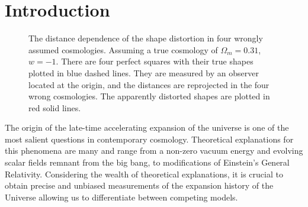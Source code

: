 \documentclass[iop]{emulateapj}
\begin{document}

\section{Introduction}

\begin{figure}
   \caption{\label{fig_xy}
   The distance dependence of the shape distortion in four wrongly assumed cosmologies.
   Assuming a true cosmology of $\Omega_m=0.31$, $w=-1$.
   There are four perfect squares with their true shapes plotted in blue dashed lines.
   They are measured by an observer located at the origin, and the distances are reprojected in the four wrong cosmologies.
   The apparently distorted shapes are plotted in red solid lines.
   }
\end{figure}

The  origin  of  the late-time accelerating  expansion  of  the  universe  is  one of  the  most  salient  questions  in  contemporary cosmology. 
Theoretical explanations for this phenomena are many and range from a non-zero  vacuum energy and evolving  scalar  fields  remnant  from  the  big  bang, 
to modifications of Einstein's General Relativity\cite{2012IJMPD..2130002Y}. 
Considering the wealth of theoretical explanations, 
it is crucial to obtain precise and unbiased measurements of the expansion history of the Universe allowing us to 
differentiate between competing models. 
\end{document}
